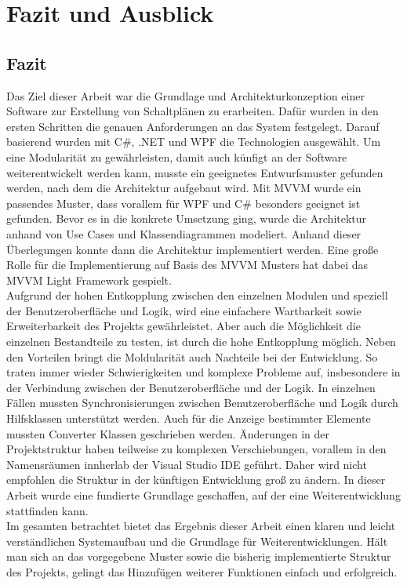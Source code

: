 \chapter{Fazit und Ausblick}
\section{Fazit}
Das Ziel dieser Arbeit war die Grundlage und Architekturkonzeption einer Software zur Erstellung von Schaltplänen zu erarbeiten. Dafür wurden in den ersten Schritten die genauen Anforderungen an das System festgelegt. Darauf basierend wurden mit C\#, .NET und WPF die Technologien ausgewählt. Um eine Modularität zu gewährleisten, damit auch künfigt an der Software weiterentwickelt werden kann, musste ein geeignetes Entwurfsmuster gefunden werden, nach dem die Architektur aufgebaut wird. Mit MVVM wurde ein passendes Muster, dass vorallem für WPF und C\# besonders geeignet ist gefunden. Bevor es in die konkrete Umsetzung ging, wurde die Architektur anhand von Use Cases und Klassendiagrammen modeliert. Anhand dieser Überlegungen konnte dann die Architektur implementiert werden. Eine große Rolle für die Implementierung auf Basis des MVVM Musters hat dabei das MVVM Light Framework gespielt. 
\\
\linebreak
Aufgrund der hohen Entkopplung zwischen den einzelnen Modulen und speziell der Benutzeroberfläche und Logik, wird eine einfachere Wartbarkeit sowie Erweiterbarkeit des Projekts gewährleistet. Aber auch die Möglichkeit die einzelnen Bestandteile zu testen, ist durch die hohe Entkopplung möglich. Neben den Vorteilen bringt die Moldularität auch Nachteile bei der Entwicklung. So traten immer wieder Schwierigkeiten und komplexe Probleme auf, insbesondere in der Verbindung zwischen der Benutzeroberfläche und der Logik. In einzelnen Fällen mussten Synchronisierungen zwischen Benutzeroberfläche und Logik durch Hilfsklassen unterstützt werden. Auch für die Anzeige bestimmter Elemente mussten Converter Klassen geschrieben werden. Änderungen in der Projektstruktur haben teilweise zu komplexen Verschiebungen, vorallem in den Namensräumen innherlab der Visual Studio IDE geführt. Daher wird nicht empfohlen die Struktur in der künftigen Entwicklung groß zu ändern. In dieser Arbeit wurde eine fundierte Grundlage geschaffen, auf der eine Weiterentwicklung stattfinden kann. 
\\
\linebreak
Im gesamten betrachtet bietet das Ergebnis dieser Arbeit einen klaren und leicht verständlichen Systemaufbau und die Grundlage für Weiterentwicklungen. Hält man sich an das vorgegebene Muster sowie die bisherig implementierte Struktur des Projekts, gelingt das Hinzufügen weiterer Funktionen einfach und erfolgreich.
\\
